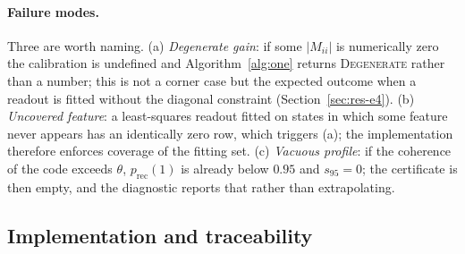\paragraph{Failure modes.} Three are worth naming. (a) \emph{Degenerate gain}: if some
$|M_{ii}|$ is numerically zero the calibration is undefined and Algorithm~\ref{alg:one}
returns \textsc{Degenerate} rather than a number; this is not a corner case but the expected
outcome when a readout is fitted without the diagonal constraint
(Section~\ref{sec:res-e4}). (b) \emph{Uncovered feature}: a least-squares readout fitted on
states in which some feature never appears has an identically zero row, which triggers (a);
the implementation therefore enforces coverage of the fitting set. (c) \emph{Vacuous profile}:
if the coherence of the code exceeds $\theta$, $p_{\mathrm{rec}}(1)$ is already below $0.95$
and $s_{95}=0$; the certificate is then empty, and the diagnostic reports that rather than
extrapolating.

\subsection{Implementation and traceability}

